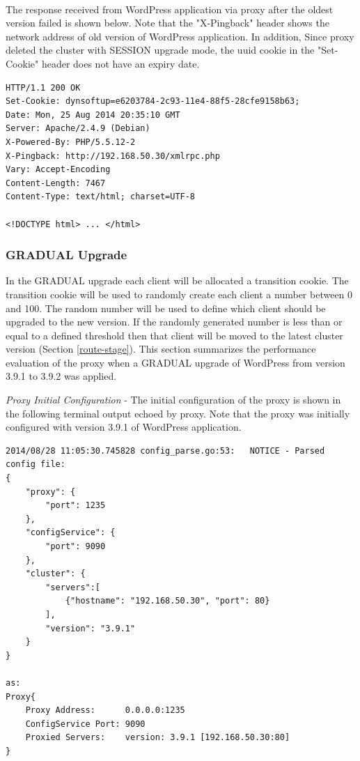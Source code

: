 \documentclass[a4paper,11pt,twoside]{report}
\begin{document}
\noindent\\
The response received from WordPress application via proxy after the oldest version failed is shown below. Note that the "X-Pingback" header shows the network address of old version of WordPress application. In addition, Since proxy deleted the cluster with SESSION upgrade mode, the uuid cookie in the "Set-Cookie" header does not have an expiry date.\smallskip 

\begin{lstlisting}[language=terminal]
HTTP/1.1 200 OK
Set-Cookie: dynsoftup=e6203784-2c93-11e4-88f5-28cfe9158b63;
Date: Mon, 25 Aug 2014 20:35:10 GMT
Server: Apache/2.4.9 (Debian)
X-Powered-By: PHP/5.5.12-2
X-Pingback: http://192.168.50.30/xmlrpc.php
Vary: Accept-Encoding
Content-Length: 7467
Content-Type: text/html; charset=UTF-8

<!DOCTYPE html> ... </html>
\end{lstlisting}

\subsubsection*{GRADUAL Upgrade}
In the GRADUAL upgrade each client will be allocated a transition cookie. The transition cookie will be used to randomly create each client a number between 0 and 100. The random number will be used to define which client should be upgraded to the new version. If the randomly generated number is less than or equal to a defined threshold then that client will be moved to the latest cluster version (Section \ref{route-stage}). This section summarizes the performance evaluation of the proxy when a GRADUAL upgrade of WordPress from version 3.9.1 to 3.9.2 was applied. \medskip

\noindent
\textit{Proxy Initial Configuration} - The initial configuration of the proxy is shown in the following terminal output echoed by proxy. Note that the proxy was initially configured with version 3.9.1 of WordPress application.\smallskip

\begin{lstlisting}[language=terminal]
2014/08/28 11:05:30.745828 config_parse.go:53:   NOTICE - Parsed config file:
{
    "proxy": {
        "port": 1235
    },
    "configService": {
        "port": 9090
    },
    "cluster": {
        "servers":[
            {"hostname": "192.168.50.30", "port": 80}
        ],
        "version": "3.9.1"
    }
}

as:
Proxy{
	Proxy Address:      0.0.0.0:1235
	ConfigService Port: 9090
	Proxied Servers:    version: 3.9.1 [192.168.50.30:80]
}
\end{lstlisting}
\end{document}
